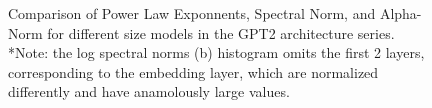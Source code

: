 \begin{figure}[t]
    \centering

    \qquad
    \qquad
    \caption{Comparison of Power Law Exponnents, Spectral Norm, and Alpha-Norm for different size models in the GPT2 architecture series.  *Note: the log spectral norms (b) histogram omits the first 2 layers, corresponding to the embedding layer, which are normalized differently and have anamolously large values.}
    \label{fig:gpt2-histograms}
\end{figure}





